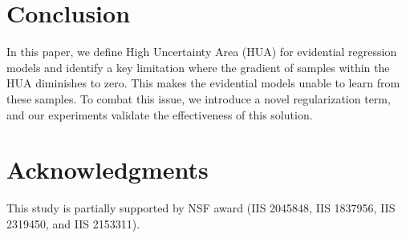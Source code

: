 \section{Conclusion}
In this paper, we define High Uncertainty Area (HUA) for evidential regression models and identify a key limitation where the gradient of samples within the HUA diminishes to zero. This makes the evidential models unable to learn from these samples. To combat this issue, we introduce a novel regularization term, and our experiments validate the effectiveness of this solution.

\section{Acknowledgments}
This study is partially supported by NSF award (IIS 2045848, IIS 1837956, IIS 2319450, and IIS 2153311).

